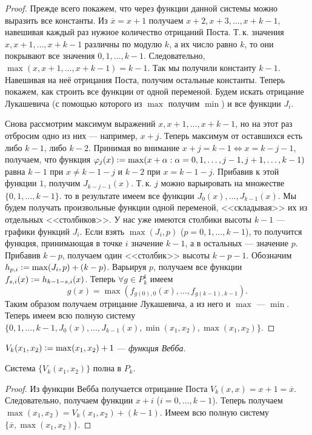 \begin{proof}
    Прежде всего покажем, что через функции данной системы можно выразить все константы. Из $\overline{x} = x + 1$ получаем $x + 2, x + 3, \ldots, x + k - 1$, навешивая каждый раз нужное количество отрицаний Поста. Т.\,к. значения $x, x + 1, \ldots, x + k - 1$ различны по модулю $k$, а их число равно $k$, то они покрывают все значения $0, 1, \ldots, k - 1$. Следовательно, $\max(x, x + 1, \ldots, x + k - 1) = k - 1$. Так мы получили константу $k - 1$. Навешивая на неё отрицания Поста, получим остальные константы. Теперь покажем, как строить все функции от одной переменой. Будем искать отрицание Лукашевича (с помощью которого из $\max$ получим $\min$) и все функции $J_i$.

    Снова рассмотрим максимум выражений $x, x + 1, \ldots, x + k - 1$, но на этот раз отбросим одно из них --- например, $x + j$. Теперь максимум от оставшихся есть либо $k - 1$, либо $k - 2$. Принимая во внимание $x + j = k - 1 \Leftrightarrow x = k - j - 1$, получаем, что функция $\varphi_j(x) \vcentcolon = \max(x + \alpha : \alpha = 0, 1, \ldots, j - 1, j + 1, \ldots, k - 1)$ равна $k - 1$ при $x \ne k - 1 - j$ и $k - 2$ при $x = k - 1 - j$. Прибавив к этой функции $1$, получим $J_{k - j - 1}(x)$. Т.\,к. $j$ можно варьировать на множестве $\{0, 1, \ldots, k - 1\}$. то в результате имеем все функции $J_0(x), \ldots, J_{k - 1}(x)$. Мы будем получать произвольные функции одной переменой, <<складывая>> их из отдельных <<столбиков>>. У нас уже имеются столбики высоты $k - 1$ --- графики функций $J_i$. Если взять $\max(J_i, p)$ ($p = 0, 1, \ldots, k - 1$), то получится функция, принимающая в точке $i$ значение $k - 1$, а в остальных --- значение $p$. Прибавив $k - p$, получаем один <<столбик>> высоты $k - p - 1$. Обозначим $h_{p, i} \vcentcolon = \max(J_i, p) + (k - p)$. Варьируя $p$, получаем все функции $f_{s, i}(x) \vcentcolon = h_{k - 1 - s, i}(x)$. Теперь $\forall g \in P_k^1$ имеем
    \[
        g(x) = \max(f_{g(0), 0}(x), \ldots, f_{g(k - 1), k - 1}).
    \]
    Таким образом получаем отрицание Лукашевича, а из него и $\max$ --- $\min$. Теперь имеем всю полную систему $\{0, 1, \ldots, k - 1, J_0(x), \ldots, J_{k - 1}(x), \min(x_1, x_2), \max(x_1, x_2)\}$.
\end{proof}

\begin{definition}
    $V_k(x_1, x_2) \vcentcolon = \max(x_1, x_2) + 1$ --- \textit{функция Вебба}.
\end{definition}

\begin{theorem}
    Система $\{V_k(x_1, x_2)\}$ полна в $P_k$.
\end{theorem}

\begin{proof}
    Из функции Вебба получается отрицание Поста $V_k(x, x) = x + 1 = \overline{x}$. Следовательно, получаем функции $x + i$ ($i = 0, \ldots, k - 1$). Теперь получаем $\max(x_1, x_2) = V_k(x_1, x_2) + (k - 1)$. Имеем всю полную систему $\{\overline{x}, \max(x_1, x_2)\}$.
\end{proof}

